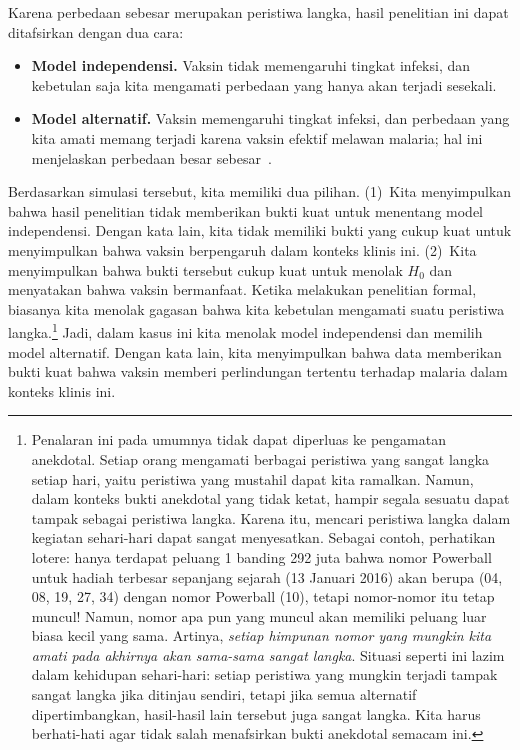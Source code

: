Karena perbedaan sebesar \malariaIRDiffPerc{} merupakan
peristiwa langka, hasil penelitian ini dapat ditafsirkan
dengan dua cara:
\begin{itemize}
  \setlength{\itemsep}{0mm}
  \item[$H_0$] \textbf{Model independensi.}
      Vaksin tidak memengaruhi tingkat infeksi,
      dan kebetulan saja kita mengamati perbedaan yang
      hanya akan terjadi sesekali.
  \item[$H_A$] \textbf{Model alternatif.}
      Vaksin memengaruhi tingkat infeksi,
      dan perbedaan yang kita amati memang terjadi karena
      vaksin efektif melawan malaria; hal ini menjelaskan
      perbedaan besar sebesar~\malariaIRDiffPerc{}.
\end{itemize}
Berdasarkan simulasi tersebut, kita memiliki dua pilihan.
(1)~Kita menyimpulkan bahwa hasil penelitian tidak memberikan
bukti kuat untuk menentang model independensi.
Dengan kata lain, kita tidak memiliki bukti yang cukup kuat
untuk menyimpulkan bahwa vaksin berpengaruh dalam
konteks klinis ini.
(2)~Kita menyimpulkan bahwa bukti tersebut cukup kuat
untuk menolak $H_0$ dan menyatakan bahwa vaksin bermanfaat.
Ketika melakukan penelitian formal, biasanya kita menolak
gagasan bahwa kita kebetulan mengamati suatu peristiwa
langka.\footnote{Penalaran ini pada umumnya tidak dapat diperluas
    ke pengamatan anekdotal.
    Setiap orang mengamati berbagai peristiwa yang sangat langka
    setiap hari, yaitu peristiwa yang mustahil dapat kita ramalkan.
    Namun, dalam konteks bukti anekdotal yang tidak ketat,
    hampir segala sesuatu dapat tampak sebagai peristiwa langka.
    Karena itu, mencari peristiwa langka dalam kegiatan sehari-hari
    dapat sangat menyesatkan.
    Sebagai contoh, perhatikan lotere:
    hanya terdapat peluang 1 banding 292 juta bahwa nomor Powerball
    untuk hadiah terbesar sepanjang sejarah (13 Januari 2016)
    akan berupa (04, 08, 19, 27, 34) dengan nomor Powerball (10),
    tetapi nomor-nomor itu tetap muncul!
    Namun, nomor apa pun yang muncul
    akan memiliki peluang luar biasa kecil yang sama.
    Artinya, \emph{setiap himpunan nomor yang mungkin kita amati
    pada akhirnya akan sama-sama sangat langka}.
    Situasi seperti ini lazim dalam kehidupan sehari-hari:
    setiap peristiwa yang mungkin terjadi tampak sangat langka
    jika ditinjau sendiri, tetapi jika semua alternatif dipertimbangkan,
    hasil-hasil lain tersebut juga sangat langka.
    Kita harus berhati-hati agar tidak salah menafsirkan
    bukti anekdotal semacam ini.}
Jadi, dalam kasus ini kita menolak model independensi dan memilih
model alternatif.
Dengan kata lain, kita menyimpulkan bahwa data memberikan bukti kuat
bahwa vaksin memberi perlindungan tertentu terhadap malaria
dalam konteks klinis ini.

